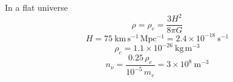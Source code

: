In a flat universe
\begin{equation*}
\rho = \rho_c = \frac{3H^2}{8\pi G} \tag*{(4 points)}
\end{equation*}
\begin{equation*}
H = 75~\mathrm{km\,s^{-1}\,Mpc^{-1}} = 2.4\times10^{-18}~\mathrm{s^{-1}}
\tag*{(2 points)}
\end{equation*}
\begin{equation*}
\rho_c = 1.1\times10^{-26}~\mathrm{kg\,m^{-3}} \tag*{(2 points)}
\end{equation*}
\begin{equation*}
n_\nu = \frac{0.25\,\rho_c}{10^{-5}\,m_e} = 3\times10^{8}~\mathrm{m^{-3}}
\tag*{(2 points)}
\end{equation*}
